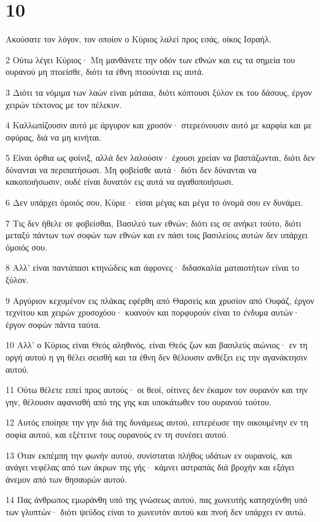 \chapter{10}

\par Ακούσατε τον λόγον, τον οποίον ο Κύριος λαλεί προς εσάς, οίκος Ισραήλ.
\par 2 Ούτω λέγει Κύριος· Μη μανθάνετε την οδόν των εθνών και εις τα σημεία του ουρανού μη πτοείσθε, διότι τα έθνη πτοούνται εις αυτά.
\par 3 Διότι τα νόμιμα των λαών είναι μάταια, διότι κόπτουσι ξύλον εκ του δάσους, έργον χειρών τέκτονος με τον πέλεκυν.
\par 4 Καλλωπίζουσιν αυτό με άργυρον και χρυσόν· στερεόνουσιν αυτό με καρφία και με σφύρας, διά να μη κινήται.
\par 5 Είναι όρθια ως φοίνιξ, αλλά δεν λαλούσιν· έχουσι χρείαν να βαστάζωνται, διότι δεν δύνανται να περιπατήσωσι. Μη φοβείσθε αυτά· διότι δεν δύνανται να κακοποιήσωσιν, ουδέ είναι δυνατόν εις αυτά να αγαθοποιήσωσι.
\par 6 Δεν υπάρχει όμοιός σου, Κύριε· είσαι μέγας και μέγα το όνομά σου εν δυνάμει.
\par 7 Τις δεν ήθελε σε φοβείσθαι, Βασιλεύ των εθνών; διότι εις σε ανήκει τούτο, διότι μεταξύ πάντων των σοφών των εθνών και εν πάσι τοις βασιλείοις αυτών δεν υπάρχει όμοιός σου.
\par 8 Αλλ' είναι παντάπασι κτηνώδεις και άφρονες· διδασκαλία ματαιοτήτων είναι το ξύλον.
\par 9 Αργύριον κεχυμένον εις πλάκας εφέρθη από Θαρσείς και χρυσίον από Ουφάζ, έργον τεχνίτου και χειρών χρυσοχόου· κυανούν και πορφυρούν είναι το ένδυμα αυτών· έργον σοφών πάντα ταύτα.
\par 10 Αλλ' ο Κύριος είναι Θεός αληθινός, είναι Θεός ζων και βασιλεύς αιώνιος· εν τη οργή αυτού η γη θέλει σεισθή και τα έθνη δεν θέλουσιν ανθέξει εις την αγανάκτησιν αυτού.
\par 11 Ούτω θέλετε ειπεί προς αυτούς· οι θεοί, οίτινες δεν έκαμον τον ουρανόν και την γην, θέλουσιν αφανισθή από της γης και υποκάτωθεν του ουρανού τούτου.
\par 12 Αυτός εποίησε την γην διά της δυνάμεως αυτού, εστερέωσε την οικουμένην εν τη σοφία αυτού, και εξέτεινε τους ουρανούς εν τη συνέσει αυτού.
\par 13 Όταν εκπέμπη την φωνήν αυτού, συνίσταται πλήθος υδάτων εν ουρανοίς, και ανάγει νεφέλας από των άκρων της γής· κάμνει αστραπάς διά βροχήν και εξάγει άνεμον από των θησαυρών αυτού.
\par 14 Πας άνθρωπος εμωράνθη υπό της γνώσεως αυτού, πας χωνευτής κατησχύνθη υπό των γλυπτών· διότι ψεύδος είναι το χωνευτόν αυτού και πνοή δεν υπάρχει εν αυτώ.
